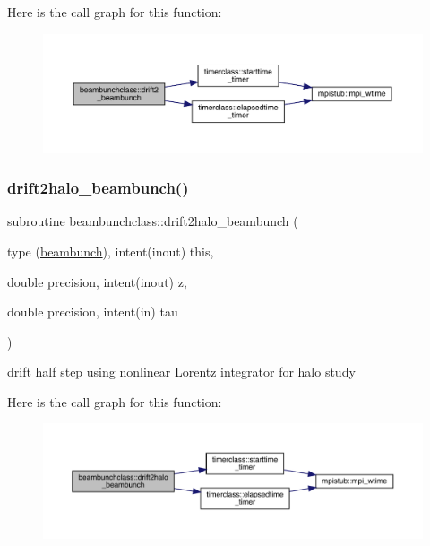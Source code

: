 Here is the call graph for this function\+:\nopagebreak
\begin{figure}[H]
\begin{center}
\leavevmode
\includegraphics[width=350pt]{namespacebeambunchclass_a6e3aecf1a2cf3d54950c09c603c2f11c_cgraph}
\end{center}
\end{figure}
\mbox{\label{namespacebeambunchclass_a3f5a86fb4b3ff5b33efdfa76b1c52ce4}} 
\subsubsection{\texorpdfstring{drift2halo\_beambunch()}{drift2halo\_beambunch()}}
{\footnotesize\ttfamily subroutine beambunchclass\+::drift2halo\+\_\+beambunch (\begin{DoxyParamCaption}\item[{type (\mbox{\hyperlink{namespacebeambunchclass_structbeambunchclass_1_1beambunch}{beambunch}}), intent(inout)}]{this,  }\item[{double precision, intent(inout)}]{z,  }\item[{double precision, intent(in)}]{tau }\end{DoxyParamCaption})}



drift half step using nonlinear Lorentz integrator for halo study 

Here is the call graph for this function\+:\nopagebreak
\begin{figure}[H]
\begin{center}
\leavevmode
\includegraphics[width=350pt]{namespacebeambunchclass_a3f5a86fb4b3ff5b33efdfa76b1c52ce4_cgraph}
\end{center}
\end{figure}
\mbox{\label{namespacebeambunchclass_a8970622c75fe29b57d31607d71692976}} 
